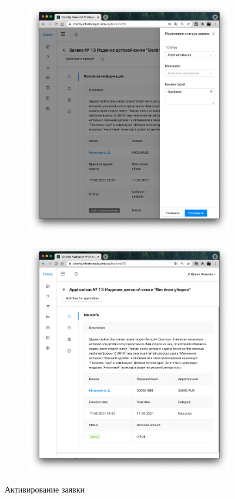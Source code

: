 \documentclass[a4paper,12pt,reqno]{article}
\begin{document}
	\begin{figure}[H]
	    \centering
		\begin{subfigure}[b]{0.475\linewidth}
			\includegraphics[width=\linewidth]{img/ro/activate.png}
		\end{subfigure}
		\begin{subfigure}[b]{0.475\linewidth}
			\includegraphics[width=\linewidth]{img/ro/active_page.png}
		\end{subfigure}
		\caption{Активирование заявки}
		\label{pic: active}
	\end{figure}
	
\end{document}

